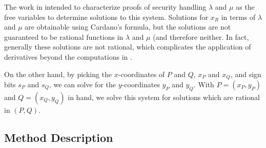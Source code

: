 \documentclass[11pt,letterpaper]{article}
\theoremstyle{definition}
\newcommand{\6}{\mathbf}
\newcommand{\7}{\mathcal}
\begin{document}
The work in \cite{Eagen} intended to characterize proofs of security handling $\lambda$ and $\mu$ as the free variables to determine solutions to this system. %
Solutions for $x_R$ in terms of $\lambda$ and $\mu$ are obtainable using Cardano's formula, but the solutions are not guaranteed to be rational functions in $\lambda$ and $\mu$ (and therefore neither. In fact, generally these solutions are not rational, which complicates the application of derivatives beyond the computations in \cite{Eagen}.

On the other hand, by picking the $x$-coordinates of $P$ and $Q$, $x_P$ and $x_Q$, and sign bits $s_P$ and $s_Q$, we can solve for the $y$-coordinates $y_P$ and $y_Q$. With $P=(x_P,y_P)$ and $Q=(x_Q,y_Q)$ in hand, we solve this system for solutions which are rational in $(P,Q)$. 






\subsection{Method Description}
\end{document}

